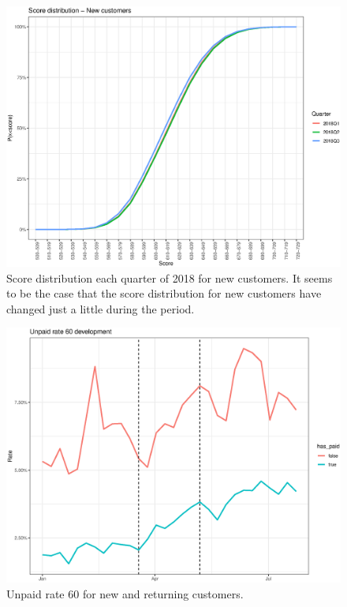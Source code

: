 \begin{figure}[!ht]
  \centering
  \includegraphics[width=5in,trim={0 0 0 0},clip]{content/figures/score_dev_nl_new.eps} 
  \caption{Score distribution each quarter of 2018 for new customers. It seems to be the case that the score distribution for new customers have changed just a little during the period.}
  \label{fig:score_dev_new}
\end{figure}


\begin{figure}[!ht]
  \centering
  \includegraphics[width=5in,trim={0 0 0 0},clip]{content/figures/rate60_dev_nl_hp.eps} 
  \caption{Unpaid rate 60 for new and returning customers.}
  \label{fig:rate60_dev_hp}
\end{figure}


